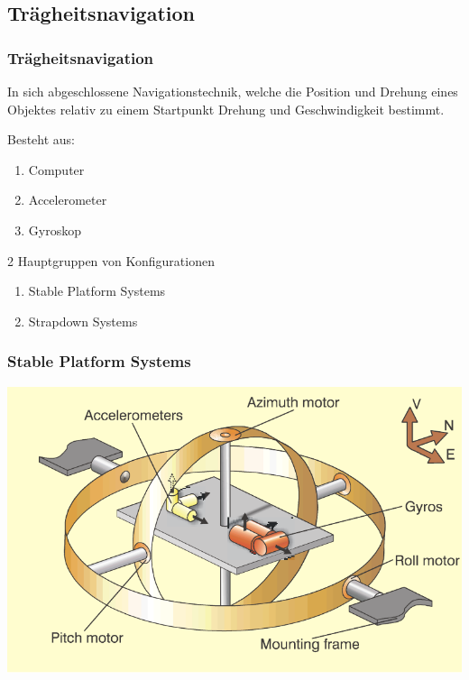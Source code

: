 \documentclass[10pt,a4paper,oneside]{beamer}
\begin{document}
\begin{frame}
	\section{Trägheitsnavigation}
	\frametitle{Trägheitsnavigation}
	In sich abgeschlossene Navigationstechnik, 
	welche die Position und Drehung eines Objektes relativ zu einem Startpunkt Drehung und Geschwindigkeit bestimmt.
	
	Besteht aus:
	\begin{enumerate}
		\item Computer
		\item Accelerometer
		\item Gyroskop
	\end{enumerate}
	
	2 Hauptgruppen von Konfigurationen \cite{Wood07}
	\begin{enumerate}
		\item Stable Platform Systems
		\item Strapdown Systems
	\end{enumerate}
\end{frame}
\begin{frame}
	\frametitle{Stable Platform Systems}
	   
		\includegraphics[scale=0.55]{images/gimbal.png} \cite{King98}


\end{frame}
\end{document}
